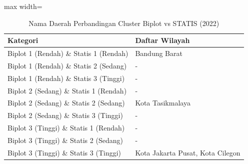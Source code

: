 \begin{table}[H]
\centering
\caption{Nama Daerah Perbandingan Cluster Biplot vs STATIS (2022)} \label{tab:samplebiplot_statis_comp_name_2022}
\begin{adjustbox}{max width=\textwidth}
\begin{tabular}{|p{4cm}|p{10cm}|}
\hline
\textbf{Kategori} & \textbf{Daftar Wilayah} \\
\hline
Biplot 1 (Rendah) \& Statis 1 (Rendah) & Bandung Barat \\
\hline
Biplot 1 (Rendah) \& Statis 2 (Sedang) & - \\
\hline
Biplot 1 (Rendah) \& Statis 3 (Tinggi) & - \\
\hline
Biplot 2 (Sedang) \& Statis 1 (Rendah) & - \\
\hline
Biplot 2 (Sedang) \& Statis 2 (Sedang) & Kota Tasikmalaya \\
\hline
Biplot 2 (Sedang) \& Statis 3 (Tinggi) & - \\
\hline
Biplot 3 (Tinggi) \& Statis 1 (Rendah) & - \\
\hline
Biplot 3 (Tinggi) \& Statis 2 (Sedang) & - \\
\hline
Biplot 3 (Tinggi) \& Statis 3 (Tinggi) & Kota Jakarta Pusat, Kota Cilegon \\
\hline
\end{tabular}
\end{adjustbox}
\end{table}